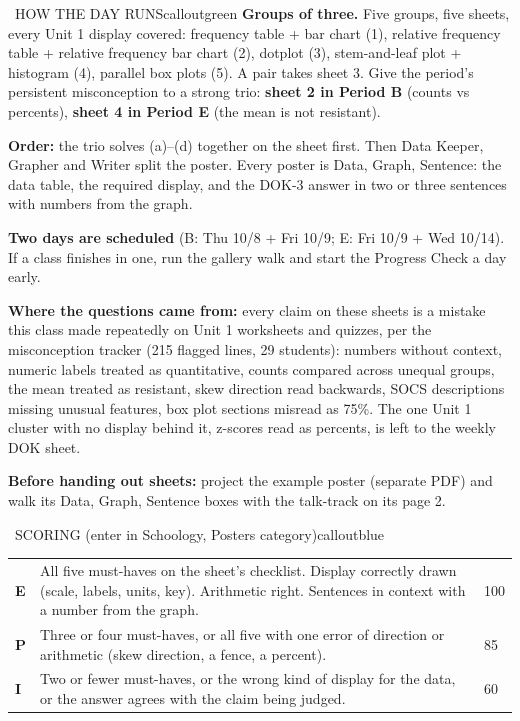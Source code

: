 \documentclass[11pt]{article}
\begin{document}

\begin{callout}{\IconBook\ HOW THE DAY RUNS}{calloutgreen}
\textbf{Groups of three.} Five groups, five sheets, every Unit 1 display covered: frequency table + bar chart (1), relative frequency table + relative frequency bar chart (2), dotplot (3), stem-and-leaf plot + histogram (4), parallel box plots (5). A pair takes sheet 3. Give the period's persistent misconception to a strong trio: \textbf{sheet 2 in Period B} (counts vs percents), \textbf{sheet 4 in Period E} (the mean is not resistant).\par\smallskip
\textbf{Order:} the trio solves (a)--(d) together on the sheet first. Then Data Keeper, Grapher and Writer split the poster. Every poster is Data, Graph, Sentence: the data table, the required display, and the DOK-3 answer in two or three sentences with numbers from the graph.\par\smallskip
\textbf{Two days are scheduled} (B: Thu 10/8 + Fri 10/9; E: Fri 10/9 + Wed 10/14). If a class finishes in one, run the gallery walk and start the Progress Check a day early.\par\smallskip
\textbf{Where the questions came from:} every claim on these sheets is a mistake this class made repeatedly on Unit 1 worksheets and quizzes, per the misconception tracker (215 flagged lines, 29 students): numbers without context, numeric labels treated as quantitative, counts compared across unequal groups, the mean treated as resistant, skew direction read backwards, SOCS descriptions missing unusual features, box plot sections misread as 75\%. The one Unit 1 cluster with no display behind it, z-scores read as percents, is left to the weekly DOK sheet.\par\smallskip
\textbf{Before handing out sheets:} project the example poster (separate PDF) and walk its Data, Graph, Sentence boxes with the talk-track on its page 2.
\end{callout}

\begin{callout}{\IconTarget\ SCORING (enter in Schoology, Posters category)}{calloutblue}
\begin{tabular}{p{0.45in}p{4.6in}p{0.7in}}
\textbf{E} & All five must-haves on the sheet's checklist. Display correctly drawn (scale, labels, units, key). Arithmetic right. Sentences in context with a number from the graph. & 100 \\[4pt]
\textbf{P} & Three or four must-haves, or all five with one error of direction or arithmetic (skew direction, a fence, a percent). & 85 \\[4pt]
\textbf{I} & Two or fewer must-haves, or the wrong kind of display for the data, or the answer agrees with the claim being judged. & 60 \\
\end{tabular}
\end{callout}
\end{document}
